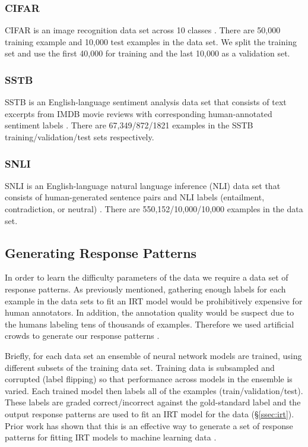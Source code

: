 \documentclass[letterpaper]{article} %
\begin{document}
\subsubsection{CIFAR} 

CIFAR is an image recognition data set across 10 classes \cite{krizhevsky_learning_2009}.
There are 50,000 training example and 10,000 test examples in the data set.
We split the training set and use the first 40,000 for training and the last 10,000 as a validation set. 

\subsubsection{SSTB} 

SSTB is an English-language sentiment analysis data set that consists of text excerpts from IMDB movie reviews with corresponding human-annotated sentiment labels \cite{socher_recursive_2013}.
There are 67,349/872/1821 examples in the SSTB training/validation/test sets respectively.

\subsubsection{SNLI} 

SNLI is an English-language natural language inference (NLI) data set that consists of human-generated sentence pairs and NLI labels (entailment, contradiction, or neutral) \cite{bowman_large_2015}.
There are 550,152/10,000/10,000 examples in the data set.

\subsection{Generating Response Patterns}

In order to learn the difficulty parameters of the data we require a data set of response patterns.
As previously mentioned, gathering enough labels for each example in the data sets to fit an IRT model would be prohibitively expensive for human annotators.
In addition, the annotation quality would be suspect due to the humans labeling tens of thousands of examples.
Therefore we used artificial crowds to generate our response patterns \cite{lalor_learning_2019}. 

Briefly, for each data set an ensemble of neural network models are trained, using different subsets of the training data set.
Training data is subsampled and corrupted (label flipping) so that performance across models in the ensemble is varied.
Each trained model then labels all of the examples (train/validation/test).
These labels are graded correct/incorrect against the gold-standard label and the output response patterns are used to fit an IRT model for the data (\S \ref{ssec:irt}).
Prior work has shown that this is an effective way to generate a set of response patterns for fitting IRT models to machine learning data \cite{lalor_learning_2019}.
\end{document}
